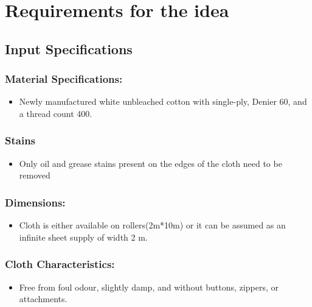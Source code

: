 \documentclass[table]{rapportCS}
\begin{document}
\section{Requirements for the idea}\label{sec:requirements} 
    

\subsection{ Input Specifications}\label{sec:inputspec}
\subsubsection{Material Specifications:}\label{sec:matspec}
    \begin{itemize}[label=$\bullet$]
      \item Newly manufactured white unbleached cotton with single-ply, Denier 60, and a thread count 400.
    \end{itemize}
\subsubsection{Stains}\label{sec:matspec}
    \begin{itemize}[label=$\bullet$]
      \item Only oil and grease stains present on the edges of the cloth need to be removed

    \end{itemize}
  
  \subsubsection{Dimensions:}\label{sec:dimensions}
    \begin{itemize}[label=$\bullet$]
      \item Cloth is either available on rollers(2m*10m) or it can be assumed as an infinite sheet supply of width 2 m.

    \end{itemize}
  
  \subsubsection{ Cloth Characteristics:}\label{sec:clothchar}
    \begin{itemize}[label=$\bullet$]
      \item Free from foul odour, slightly damp, and without buttons, zippers, or attachments.
    \end{itemize}
  
\end{document}
